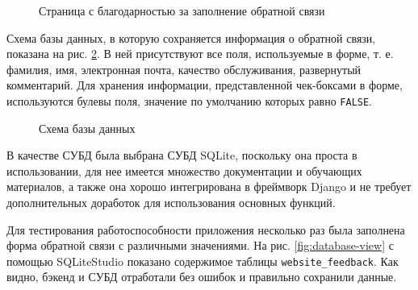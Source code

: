 \documentclass[a4paper, 14pt]{extarticle}
\begin{document}
\begin{figure}[H]
  \centering
  \caption{Страница с благодарностью за заполнение обратной связи}
  \label{fig:feedback-success}
\end{figure}

Схема базы данных, в которую сохраняется информация о обратной связи, показана
на рис. \ref{fig:database}. В ней присутствуют все поля, используемые в форме,
т. е. фамилия, имя, электронная почта, качество обслуживания, развернутый
комментарий. Для хранения информации, представленной чек-боксами в форме,
используются булевы поля, значение по умолчанию которых равно \texttt{FALSE}.

\begin{figure}[H]
  \centering
  \caption{Схема базы данных}
  \label{fig:database}
\end{figure}

В качестве СУБД была выбрана СУБД SQLite, поскольку она проста в использовании,
для нее имеется множество документации и обучающих материалов, а также она
хорошо интегрирована в фреймворк Django и не требует дополнительных доработок
для использования основных функций.

Для тестирования работоспособности приложения несколько раз была заполнена форма
обратной связи с различными значениями. На рис. \ref{fig:database-view} с
помощью SQLiteStudio показано содержимое таблицы \texttt{website\_feedback}. Как
видно, бэкенд и СУБД отработали без ошибок и правильно сохранили данные.
\end{document}
